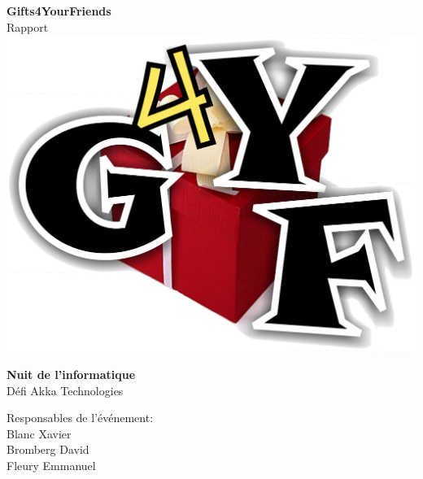 \documentclass[a4paper,francais,titlepage]{article}
\begin{document}
\begin{titlepage}
 \begin{center}
	\vspace*{1.5cm}
	\Large \textbf{Gifts4YourFriends} \\
	\small Rapport \\
	\vspace{0.5cm}
	\includegraphics[scale=0.3]{../../logo/LOGO_G4YF.png}

	\vspace{1.5cm}
	\huge \textbf{Nuit de l'informatique} \\
	\vspace{0.3cm}
	\large {Défi Akka Technologies}
	\vspace{1.5cm}
 \end{center}
 
 \begin{flushleft}
	\normalsize {\hspace{6cm}Responsables de l'événement: \\ 
				 \hspace{7.0cm} Blanc Xavier \\
				 \hspace{6.7cm} Bromberg David \\
				 \hspace{6.6cm} Fleury Emmanuel}
	\vspace{1.5cm}
 \end{flushleft}
 

\end{titlepage}
\end{document}
